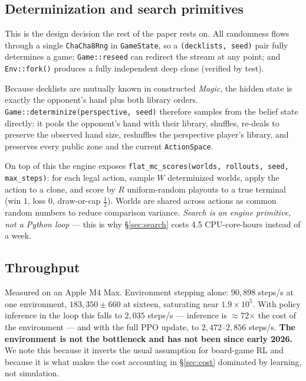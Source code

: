 \documentclass[11pt]{article}
\begin{document}
\subsection{Determinization and search primitives}
\label{sec:determinize}

This is the design decision the rest of the paper rests on. All randomness flows through a single \texttt{ChaCha8Rng} in \texttt{GameState}, so a \texttt{(decklists, seed)} pair fully determines a game; \texttt{Game::reseed} can redirect the stream at any point; and \texttt{Env::fork()} produces a fully independent deep clone (verified by test).

Because decklists are mutually known in constructed \textit{Magic}, the hidden state is exactly the opponent's hand plus both library orders. \texttt{Game::determinize(perspective, seed)} therefore samples from the belief state directly: it pools the opponent's hand with their library, shuffles, re-deals to preserve the observed hand size, reshuffles the perspective player's library, and preserves every public zone and the current \texttt{ActionSpace}.

On top of this the engine exposes \texttt{flat\_mc\_scores(worlds, rollouts, seed, max\_steps)}: for each legal action, sample $W$ determinized worlds, apply the action to a clone, and score by $R$ uniform-random playouts to a true terminal (win $1$, loss $0$, draw-or-cap $\tfrac12$). Worlds are shared across actions as common random numbers to reduce comparison variance. \emph{Search is an engine primitive, not a Python loop} --- this is why \S\ref{sec:search} costs 4.5 CPU-core-hours instead of a week.

\subsection{Throughput}

Measured on an Apple M4 Max. Environment stepping alone: $90{,}898$ steps/s at one environment, $183{,}350\pm660$ at sixteen, saturating near $1.9\times10^{5}$. With policy inference in the loop this falls to $2{,}035$ steps/s --- inference is $\approx$72$\times$ the cost of the environment --- and with the full PPO update, to $2{,}472$--$2{,}856$ steps/s. \textbf{The environment is not the bottleneck and has not been since early 2026.} We note this because it inverts the usual assumption for board-game RL and because it is what makes the cost accounting in \S\ref{sec:cost} dominated by learning, not simulation.
\end{document}
